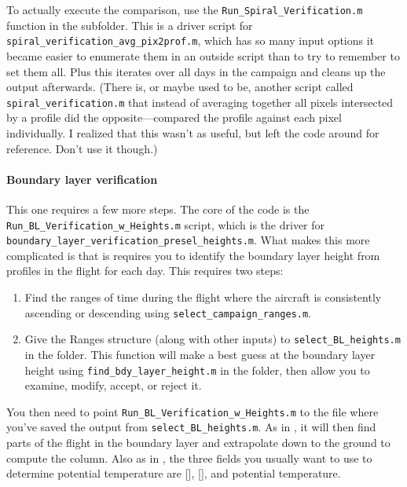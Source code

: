 \documentclass[12pt]{article}
\begin{document}
		To actually execute the comparison, use the \lstinline$Run_Spiral_Verification.m$ function in the  subfolder. This is a driver script for \lstinline$spiral_verification_avg_pix2prof.m$, which has so many input options it became easier to enumerate them in an outside script than to try to remember to set them all. Plus this iterates over all days in the campaign and cleans up the output afterwards. (There is, or maybe used to be, another script called \lstinline$spiral_verification.m$ that instead of averaging together all pixels intersected by a profile did the opposite---compared the profile against each pixel individually. I realized that this wasn't as useful, but left the code around for reference. Don't use it though.)
		
		\paragraph{Boundary layer verification}
		
		This one requires a few more steps.  The core of the code is the \lstinline$Run_BL_Verification_w_Heights.m$ script, which is the driver for \lstinline$boundary_layer_verification_presel_heights.m$. What makes this more complicated is that is requires you to identify the boundary layer height from profiles in the flight for each day. This requires two steps:
		
		\begin{enumerate}
		\item Find the ranges of time during the flight where the aircraft is consistently ascending or descending using \lstinline$select_campaign_ranges.m$.
		\item Give the Ranges structure (along with other inputs) to \lstinline$select_BL_heights.m$ in the  folder. This function will make a best guess at the boundary layer height using \lstinline$find_bdy_layer_height.m$ in the  folder, then allow you to examine, modify, accept, or reject it.
		\end{enumerate}
		
		You then need to point \lstinline$Run_BL_Verification_w_Heights.m$ to the file where you've saved the output from \lstinline$select_BL_heights.m$. As in \citet{russell11}, it will then find parts of the flight in the boundary layer and extrapolate down to the ground to compute the column. Also as in \citet{russell11}, the three fields you usually want to use to determine potential temperature are [], [], and potential temperature.
		
\end{document}
